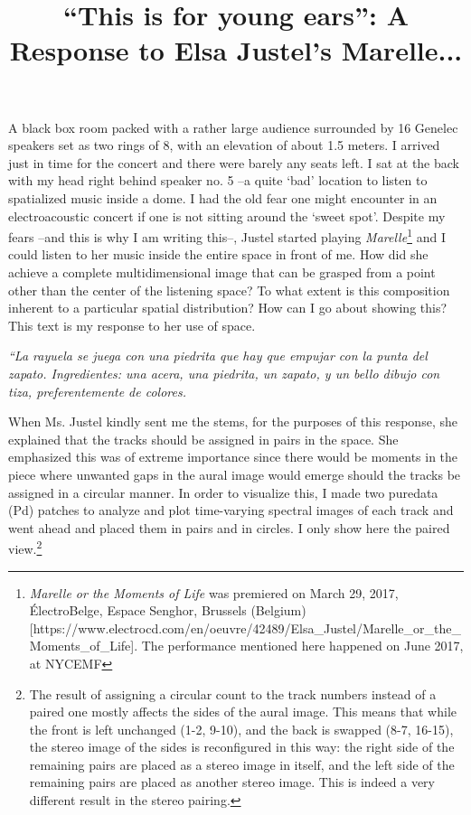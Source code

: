 \documentclass{article}
\title{``This is for young ears'': A Response to Elsa Justel's Marelle...}
\begin{document}
\maketitle

A black box room packed with a rather large audience surrounded by 16 Genelec speakers set as two rings of 8, with an elevation of about 1.5 meters. I arrived just in time for the concert and there were barely any seats left. I sat at the back with my head right behind speaker no. 5 --a quite `bad' location to listen to spatialized music inside a dome. I had the old fear one might encounter in an electroacoustic concert if one is not sitting around the `sweet spot'. Despite my fears --and this is why I am writing this--, Justel started playing \textit{Marelle}\footnote{\textit{Marelle or the Moments of Life} was premiered on March 29, 2017, \'ElectroBelge, Espace Senghor, Brussels (Belgium) [https://www.electrocd.com/en/oeuvre/42489/Elsa\_Justel/Marelle\_or\_the\_Moments\_of\_Life]. The performance mentioned here happened on June 2017, at NYCEMF} and I could listen to her music inside the entire space in front of me. How did she achieve a complete multidimensional image that can be grasped from a point other than the center of the listening space? To what extent is this composition inherent to a particular spatial distribution? How can I go about showing this? This text is my response to her use of space. 


\begin{flushright}
\textit{
``La rayuela se juega con una piedrita que hay que empujar con la punta del zapato. Ingredientes: una acera, una piedrita, un zapato, y un bello dibujo con tiza, preferentemente de colores. }
\end{flushright}



When Ms. Justel kindly sent me the stems, for the purposes of this response, she explained that the tracks should be assigned in pairs in the space. She emphasized this was of extreme importance since there would be moments in the piece where unwanted gaps in the aural image would emerge should the tracks be assigned in a circular manner. In order to visualize this, I made two puredata (Pd) patches to analyze and plot time-varying spectral images of each track and went ahead and placed them in pairs and in circles. I only show here the paired view.\footnote{The result of assigning a circular count to the track numbers instead of a paired one mostly affects the sides of the aural image. This means that while the front is left unchanged (1-2, 9-10), and the back is swapped (8-7, 16-15), the stereo image of the sides is reconfigured in this way: the right side of the remaining pairs are placed as a stereo image in itself, and the left side of the remaining pairs are placed as another stereo image. This is indeed a very different result in the stereo pairing.}
\end{document}
